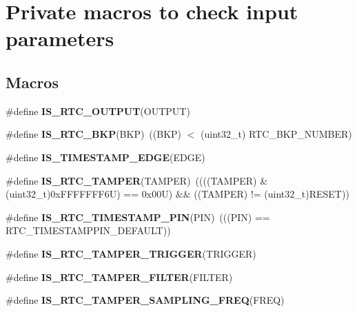 \hypertarget{group___r_t_c_ex___i_s___r_t_c___definitions}{}\section{Private macros to check input parameters}
\label{group___r_t_c_ex___i_s___r_t_c___definitions}
\subsection*{Macros}
\begin{DoxyCompactItemize}
\item 
\#define {\bfseries I\+S\+\_\+\+R\+T\+C\+\_\+\+O\+U\+T\+P\+UT}(O\+U\+T\+P\+UT)
\item 
\mbox{\label{group___r_t_c_ex___i_s___r_t_c___definitions_ga7dfcd70f7d46d2a71155b4e4e12d0a60}} 
\#define {\bfseries I\+S\+\_\+\+R\+T\+C\+\_\+\+B\+KP}(B\+KP)~((B\+KP) $<$ (uint32\+\_\+t) R\+T\+C\+\_\+\+B\+K\+P\+\_\+\+N\+U\+M\+B\+ER)
\item 
\#define {\bfseries I\+S\+\_\+\+T\+I\+M\+E\+S\+T\+A\+M\+P\+\_\+\+E\+D\+GE}(E\+D\+GE)
\item 
\mbox{\label{group___r_t_c_ex___i_s___r_t_c___definitions_ga8cb706b03efeeb8534eca0a20450d377}} 
\#define {\bfseries I\+S\+\_\+\+R\+T\+C\+\_\+\+T\+A\+M\+P\+ER}(T\+A\+M\+P\+ER)~((((T\+A\+M\+P\+ER) \& (uint32\+\_\+t)0x\+F\+F\+F\+F\+F\+F\+F6\+U) == 0x00\+U) \&\& ((\+T\+A\+M\+P\+E\+R) != (uint32\+\_\+t)\+R\+E\+S\+E\+T))
\item 
\mbox{\label{group___r_t_c_ex___i_s___r_t_c___definitions_ga5558a9d932619b51a5a60fa4746dd852}} 
\#define {\bfseries I\+S\+\_\+\+R\+T\+C\+\_\+\+T\+I\+M\+E\+S\+T\+A\+M\+P\+\_\+\+P\+IN}(P\+IN)~(((P\+IN) == R\+T\+C\+\_\+\+T\+I\+M\+E\+S\+T\+A\+M\+P\+P\+I\+N\+\_\+\+D\+E\+F\+A\+U\+LT))
\item 
\#define {\bfseries I\+S\+\_\+\+R\+T\+C\+\_\+\+T\+A\+M\+P\+E\+R\+\_\+\+T\+R\+I\+G\+G\+ER}(T\+R\+I\+G\+G\+ER)
\item 
\#define {\bfseries I\+S\+\_\+\+R\+T\+C\+\_\+\+T\+A\+M\+P\+E\+R\+\_\+\+F\+I\+L\+T\+ER}(F\+I\+L\+T\+ER)
\item 
\#define {\bfseries I\+S\+\_\+\+R\+T\+C\+\_\+\+T\+A\+M\+P\+E\+R\+\_\+\+S\+A\+M\+P\+L\+I\+N\+G\+\_\+\+F\+R\+EQ}(F\+R\+EQ)

\end{DoxyCompactItemize}
